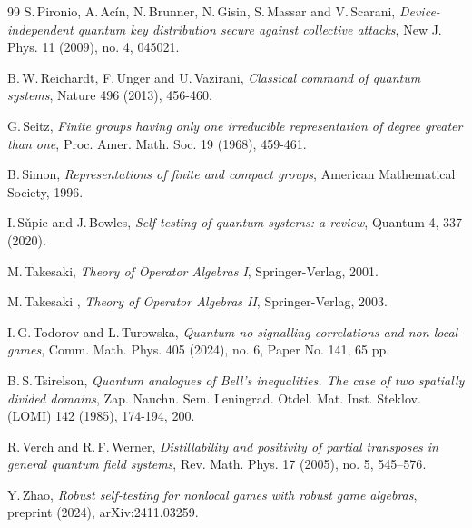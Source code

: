 \documentclass[11pt]{amsart}
\theoremstyle{definition}
\begin{document}
\begin{thebibliography}{99}
{\sc S.\,Pironio, A.\,Ac\'in, N.\,Brunner, N.\,Gisin, S.\,Massar and V.\,Scarani}, 
{\it Device-independent quantum key distribution secure against collective
attacks}, 
{\rm New J. Phys. 11 (2009), no. 4, 045021}.

{\sc B.\,W.\,Reichardt, F.\,Unger and U.\,Vazirani}, 
{\it Classical command of quantum systems}, 
{\rm Nature 496 (2013), 456-460}.


{\sc G.\,Seitz},
{\it Finite groups having only one irreducible representation of degree greater than one},
{\rm Proc. Amer. Math. Soc. 19 (1968), 459-461}.

{\sc B.\,Simon},
{\it Representations of finite and compact groups}, 
{\rm American Mathematical Society, 1996}.

{\sc I.\,S\v{u}pic and J.\,Bowles},
{\it Self-testing of quantum systems: a review},
{\rm Quantum 4, 337 (2020)}.

{\sc M.\,Takesaki},
{\it Theory of Operator Algebras I},
{\rm Springer-Verlag, 2001}.

{\sc M.\,Takesaki} ,
{\it Theory of Operator Algebras II},
{\rm Springer-Verlag, 2003}.

{\sc I.\,G.\,Todorov and L.\,Turowska},
{\it Quantum no-signalling correlations and non-local games},
{\rm Comm. Math. Phys. 405 (2024), no. 6, 
Paper No. 141, 65 pp.}


{\sc B.\,S.\,Tsirelson},
{\it Quantum analogues of Bell's inequalities. The case of two spatially divided domains},
{\rm Zap. Nauchn. Sem. Leningrad. Otdel. Mat. Inst. Steklov. (LOMI)   142 (1985), 174-194, 200}.

{\sc R.\,Verch and R.\,F.\,Werner},
{\it Distillability and positivity of partial transposes in general quantum field systems},
{\rm Rev. Math. Phys. 17 (2005), no. 5, 545--576}.

{\sc Y.\,Zhao}, 
{\it Robust self-testing for nonlocal games with robust game algebras}, 
{\rm preprint (2024), arXiv:2411.03259}.



\end{thebibliography}
\end{document}
